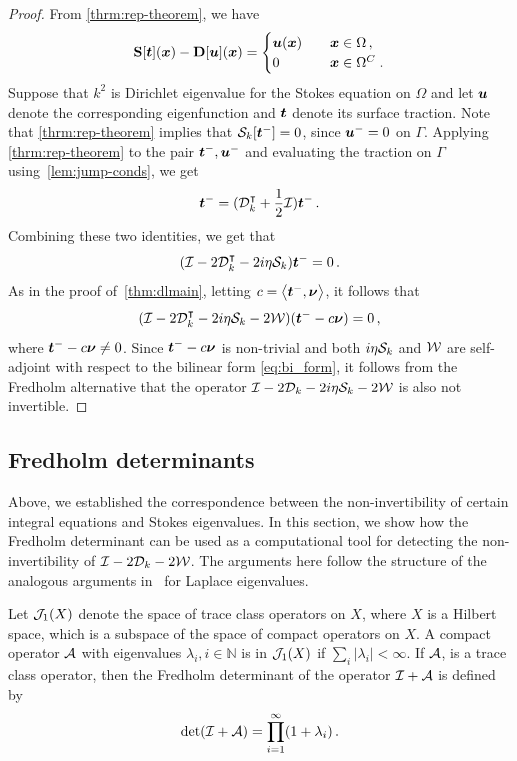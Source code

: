 \begin{proof}
From \cref{thrm:rep-theorem}, we have 
\begin{equation} 
  {\bf S} [{\boldsymbol t}]({\boldsymbol x}) - {\bf D}[{\boldsymbol u}]({\boldsymbol x}) = \begin{cases} 
    {\boldsymbol u}({\boldsymbol x}) &\quad {\boldsymbol x} \in \Omega \, , \\
    0 &\quad {\boldsymbol x} \in \Omega^{C} \; .
    \end{cases}
  \end{equation}
Suppose that $k^2$ is Dirichlet eigenvalue for
the Stokes equation on $\Omega$ and let ${\boldsymbol u}$
denote the corresponding eigenfunction and ${\boldsymbol t}$ denote
its surface traction. Note that \cref{thrm:rep-theorem}
implies that ${\mathcal S}_{k}[{\boldsymbol t}^{-}] = 0$, since
${\boldsymbol u}^{-}=0$ on $\Gamma$. Applying \cref{thrm:rep-theorem}
to the pair ${\boldsymbol t}^{-}, {\boldsymbol u}^{-}$ and evaluating the
traction on $\Gamma$ using~\cref{lem:jump-conds},
we get
\begin{equation}
{\boldsymbol t}^{-} = ({\mathcal D}^{\intercal}_{k} + \frac{1}{2} \mathcal I) {\boldsymbol t}^{-} \, . 
\end{equation}
Combining these two identities, we get
that
\begin{equation}
(\mathcal I - 2{\mathcal D}_{k}^{\intercal} -2i\eta {\mathcal S}_{k}) {\boldsymbol t}^{-} = 0 \, .
\end{equation}
As in the proof of~\cref{thm:dlmain}, letting
$c = \left< {\boldsymbol t}^{-} ,{\boldsymbol \nu} \right>$, it follows that
\begin{equation}
  (\mathcal I - 2{\mathcal D}_{k}^{\intercal} - 2i \eta {\mathcal S}_{k} - 2{\mathcal W})
  ({\boldsymbol t}^{-} - c{\boldsymbol \nu}) = 0 \, ,
\end{equation}
where ${\boldsymbol t}^{-} - c{\boldsymbol \nu} \neq 0$.
Since ${\boldsymbol t}^{-} - c{\boldsymbol \nu}$ is non-trivial and both
$i\eta {\mathcal S}_{k}$ and ${\mathcal W}$ are self-adjoint with respect
to the bilinear form \cref{eq:bi_form},
it follows from the Fredholm alternative
that the operator $\mathcal I - 2{\mathcal D}_{k} -2i\eta {\mathcal S}_k - 2{\mathcal W}$
is also not invertible.
\end{proof}

\subsection{Fredholm determinants}
\label{sec:dets}
Above, we established the correspondence between
the non-invertibility of certain integral equations
and Stokes eigenvalues. In this section, we show
how the Fredholm determinant can be used
as a computational tool for detecting the
non-invertibility of $\mathcal I - 2{\mathcal D}_{k} - 2{\mathcal W}$.
The arguments here follow the structure of the
analogous arguments in~\cite{zhao2015robust}
for Laplace eigenvalues.

Let ${\mathcal J}_{1}(X)$ denote the space of trace class operators 
on $X$, where $X$ is a Hilbert space, which is a
subspace of the space of compact operators on $X$.
A compact operator ${\mathcal A}$ with eigenvalues
$\lambda_{i}, i\in \mathbb{N}$ is in ${\mathcal J}_{1}(X)$ if
$\sum_{i} |\lambda_{i}| < \infty$.
If ${\mathcal A}$, is a trace class operator, then  
the Fredholm determinant of the operator $\mathcal I + {\mathcal A}$
is defined by
\begin{equation}
\text{det}(\mathcal I +{\mathcal A}) = \prod_{i=1}^{\infty} (1+\lambda_{i}) \, .
\end{equation}

